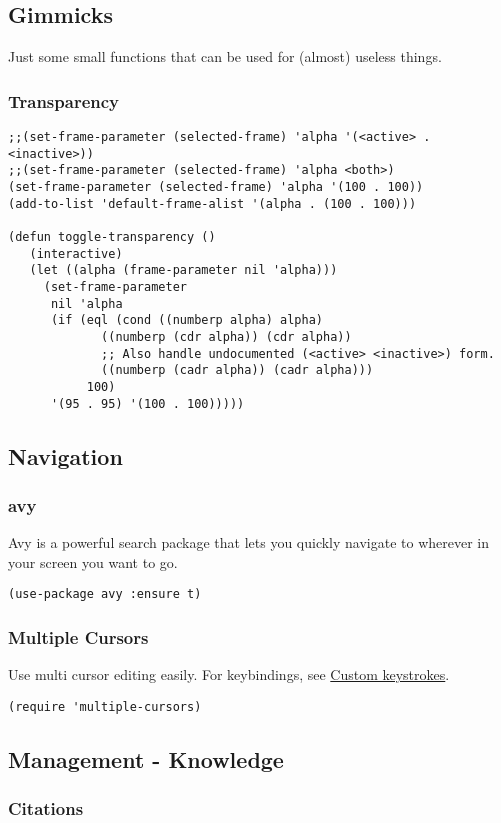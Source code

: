 \documentclass[11pt]{article}
\begin{document}
\subsection{Gimmicks}
\label{sec:org8ef3a57}
Just some small functions that can be used for (almost) useless things.
\subsubsection{Transparency}
\label{sec:org7971fc7}
\begin{verbatim}
;;(set-frame-parameter (selected-frame) 'alpha '(<active> . <inactive>))
;;(set-frame-parameter (selected-frame) 'alpha <both>)
(set-frame-parameter (selected-frame) 'alpha '(100 . 100))
(add-to-list 'default-frame-alist '(alpha . (100 . 100)))

(defun toggle-transparency ()
   (interactive)
   (let ((alpha (frame-parameter nil 'alpha)))
     (set-frame-parameter
      nil 'alpha
      (if (eql (cond ((numberp alpha) alpha)
		     ((numberp (cdr alpha)) (cdr alpha))
		     ;; Also handle undocumented (<active> <inactive>) form.
		     ((numberp (cadr alpha)) (cadr alpha)))
	       100)
	  '(95 . 95) '(100 . 100)))))
\end{verbatim}
\subsection{Navigation}
\label{sec:orga644ab5}
\subsubsection{avy}
\label{sec:orgbbdd789}
Avy is a powerful search package that lets you quickly navigate to wherever in your screen you want to go.
\begin{verbatim}
(use-package avy :ensure t)
\end{verbatim}
\subsubsection{Multiple Cursors}
\label{sec:org30630ee}
Use multi cursor editing easily. For keybindings, see \hyperref[sec:org906f9f2]{Custom keystrokes}.
\begin{verbatim}
(require 'multiple-cursors)
\end{verbatim}
\subsection{Management - Knowledge}
\label{sec:orge632bff}
\subsubsection{Citations}
\label{sec:org954ec1b}
\end{document}
